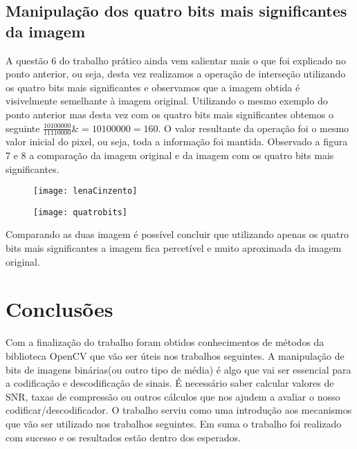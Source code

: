 \documentclass[12pt,a4paper]{article}
\begin{document}
\subsection{Manipulação dos quatro bits mais significantes da imagem}
A questão 6 do trabalho prático ainda vem salientar mais o que foi explicado no ponto anterior, ou seja, desta vez realizamos a operação de interseção utilizando os quatro bits mais significantes e observamos que a imagem obtida é visivelmente semelhante à imagem original. Utilizando o mesmo exemplo do ponto anterior mas desta vez com os quatro bits mais significantes obtemos o seguinte $\frac{10100000}{11110000}\& = 10100000 = 160$. O valor resultante da operação foi o mesmo valor inicial do pixel, ou seja, toda a informação foi mantida. Observado a  figura 7 e 8 a comparação da imagem original e da imagem com os quatro bits mais significantes.

\begin{figure}[h]
\centering
\begin{minipage}{.5\textwidth}
  \centering
  \texttt{[image: lenaCinzento]}
\end{minipage}%
\begin{minipage}{.5\textwidth}
  \centering
  \texttt{[image: quatrobits]}
\end{minipage}
\end{figure}
Comparando as duas imagem é possível concluir que utilizando apenas os quatro bits mais significantes a imagem fica percetível e muito aproximada da imagem original.

\clearpage

\section{Conclusões}
Com a finalização do trabalho foram obtidos conhecimentos de métodos da biblioteca OpenCV que vão ser úteis nos trabalhos seguintes. A manipulação de bits de imagens binárias(ou outro tipo de média) é algo que vai ser essencial para a codificação e descodificação de sinais. É necessário saber calcular valores de SNR, taxas de compressão ou outros cálculos que nos ajudem a avaliar o nosso codificar/descodificador. O trabalho serviu como uma introdução aos mecanismos que vão ser utilizado nos trabalhos seguintes. Em suma o trabalho foi realizado com sucesso e os resultados estão dentro dos esperados.
\end{document}
